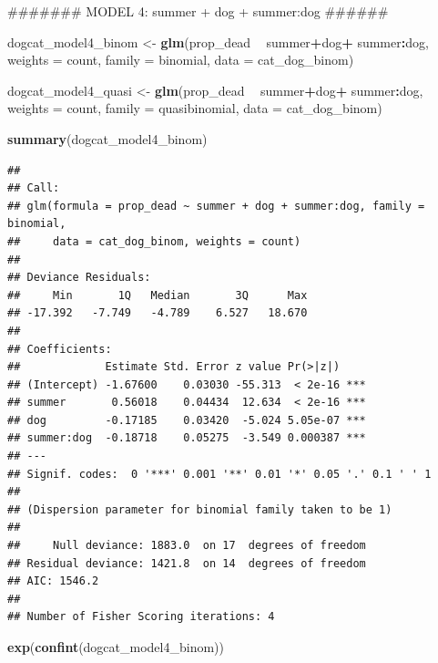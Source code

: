 \documentclass[]{article}
\newenvironment{Shaded}{\begin{snugshade}}{\end{snugshade}}
\newcommand{\KeywordTok}[1]{\textcolor[rgb]{0.13,0.29,0.53}{\textbf{#1}}}
\newcommand{\DataTypeTok}[1]{\textcolor[rgb]{0.13,0.29,0.53}{#1}}
\newcommand{\StringTok}[1]{\textcolor[rgb]{0.31,0.60,0.02}{#1}}
\newcommand{\OperatorTok}[1]{\textcolor[rgb]{0.81,0.36,0.00}{\textbf{#1}}}
\newcommand{\NormalTok}[1]{#1}
\begin{document}
\begin{Shaded}
\begin{Highlighting}[]
\NormalTok{####### MODEL 4: summer + dog + summer:dog ######}

\NormalTok{dogcat_model4_binom <-}\StringTok{ }\KeywordTok{glm}\NormalTok{(prop_dead }\OperatorTok{~}\StringTok{ }\NormalTok{summer}\OperatorTok{+}\NormalTok{dog}\OperatorTok{+}\StringTok{ }\NormalTok{summer}\OperatorTok{:}\NormalTok{dog, }\DataTypeTok{weights =}\NormalTok{ count, }\DataTypeTok{family =}\NormalTok{ binomial, }\DataTypeTok{data =}\NormalTok{ cat_dog_binom)}

\NormalTok{dogcat_model4_quasi <-}\StringTok{ }\KeywordTok{glm}\NormalTok{(prop_dead }\OperatorTok{~}\StringTok{ }\NormalTok{summer}\OperatorTok{+}\NormalTok{dog}\OperatorTok{+}\StringTok{ }\NormalTok{summer}\OperatorTok{:}\NormalTok{dog, }\DataTypeTok{weights =}\NormalTok{ count, }\DataTypeTok{family =}\NormalTok{ quasibinomial, }\DataTypeTok{data =}\NormalTok{ cat_dog_binom)}

\KeywordTok{summary}\NormalTok{(dogcat_model4_binom)}
\end{Highlighting}
\end{Shaded}

\begin{verbatim}
## 
## Call:
## glm(formula = prop_dead ~ summer + dog + summer:dog, family = binomial, 
##     data = cat_dog_binom, weights = count)
## 
## Deviance Residuals: 
##     Min       1Q   Median       3Q      Max  
## -17.392   -7.749   -4.789    6.527   18.670  
## 
## Coefficients:
##             Estimate Std. Error z value Pr(>|z|)    
## (Intercept) -1.67600    0.03030 -55.313  < 2e-16 ***
## summer       0.56018    0.04434  12.634  < 2e-16 ***
## dog         -0.17185    0.03420  -5.024 5.05e-07 ***
## summer:dog  -0.18718    0.05275  -3.549 0.000387 ***
## ---
## Signif. codes:  0 '***' 0.001 '**' 0.01 '*' 0.05 '.' 0.1 ' ' 1
## 
## (Dispersion parameter for binomial family taken to be 1)
## 
##     Null deviance: 1883.0  on 17  degrees of freedom
## Residual deviance: 1421.8  on 14  degrees of freedom
## AIC: 1546.2
## 
## Number of Fisher Scoring iterations: 4
\end{verbatim}

\begin{Shaded}
\begin{Highlighting}[]
\KeywordTok{exp}\NormalTok{(}\KeywordTok{confint}\NormalTok{(dogcat_model4_binom))}
\end{Highlighting}
\end{Shaded}
\end{document}
